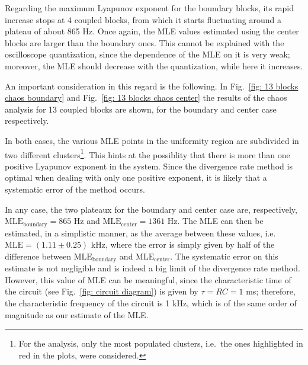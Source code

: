 Regarding the maximum Lyapunov exponent for the boundary blocks, its rapid increase stops at 4 coupled
blocks, from which it starts fluctuating around a plateau of about 865 Hz.
Once again, the MLE values estimated using the center blocks are larger than the boundary ones.
This cannot be explained with the oscilloscope quantization, since the dependence of the MLE on
it is very weak; moreover, the MLE should decrease with the quantization, while here it increases.

An important consideration in this regard is the following. In Fig.~\ref{fig: 13 blocks chaos boundary}
and Fig.~\ref{fig: 13 blocks chaos center}
the results of the chaos analysis for 13 coupled blocks are shown, for the boundary and center case
respectively.

In both cases, the various MLE points in the uniformity region are subdivided in two different clusters\footnote{
For the analysis, only the most populated clusters, i.e.\ the ones highlighted in red in the plots,
were considered.}.
This hints at the possiblity that there is more than one positive Lyapunov exponent in the system.
Since the divergence rate method is optimal when dealing with only one positive exponent,
it is likely that a systematic error of the method occurs.

In any case, the two plateaux for the boundary and center case are, respectively,
$\text{MLE}_\text{boundary}=865$ Hz and $\text{MLE}_\text{center}=1361$ Hz.
The MLE can then be estimated, in a simplistic manner, as the average between
these values, i.e.\ $\text{MLE}=(1.11\pm0.25)$ kHz, where the error is simply given by half of the difference
between $\text{MLE}_\text{boundary}$ and $\text{MLE}_\text{center}$.
The systematic error on this estimate
is not negligible and is indeed a big limit of the divergence rate method.
However, this value of MLE can be meaningful, since the characteristic time of the circuit
(see Fig.~\ref{fig: circuit diagram}) is given by $\tau=RC=1$ ms; therefore, the characteristic
frequency of the circuit is 1 kHz, which is of the same order of magnitude as our estimate of the MLE\@.

